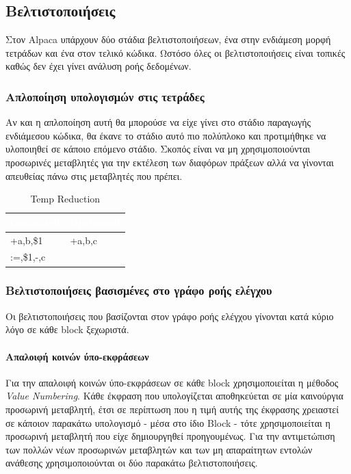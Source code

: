 \documentclass[12pt]{article}
\begin{document}
\subsection{Βελτιστοποιήσεις}
Στον Alpaca υπάρχουν δύο στάδια βελτιστοποιήσεων, ένα στην ενδιάμεση μορφή τετράδων και ένα στον τελικό κώδικα. Ωστόσο όλες οι βελτιστοποιήσεις είναι τοπικές καθώς δεν έχει γίνει ανάλυση ροής δεδομένων.
\subsubsection{Απλοποίηση υπολογισμών στις τετράδες}
Αν και η απλοποίηση αυτή θα μπορούσε να είχε γίνει στο στάδιο παραγωγής ενδιάμεσου κώδικα, θα έκανε το στάδιο αυτό πιο πολύπλοκο και προτιμήθηκε να υλοποιηθεί σε κάποιο επόμενο στάδιο. Σκοπός είναι να μη χρησιμοποιούνται προσωρινές μεταβλητές για την εκτέλεση των διαφόρων πράξεων αλλά να γίνονται απευθείας πάνω στις μεταβλητές που πρέπει.

\begin{table}
\centering
\begin{tabular}{|l|l|}
\hline
   \rowcolor{ablack}
    \textcolor{white}{Generated} & \textcolor{white}{Optimized} \\ \hline
    
    \rowcolor{gray}  
    +a,b,\$1 & +a,b,c \\ 
    \rowcolor{gray}    
    :=,\$1,-,c & \\
    
\hline
\end{tabular}
\caption{Temp Reduction}
\end{table}
\subsubsection{Βελτιστοποιήσεις βασισμένες στο γράφο ροής ελέγχου}
Οι βελτιστοποιήσεις που βασίζονται στον γράφο ροής ελέγχου γίνονται κατά κύριο λόγο σε κάθε block ξεχωριστά.
\paragraph{Απαλοιφή κοινών ύπο-εκφράσεων}
Για την απαλοιφή κοινών ύπο-εκφράσεων σε κάθε block χρησιμοποιείται η μέθοδος \textit{Value Numbering}. Κάθε έκφραση που υπολογίζεται αποθηκεύεται σε μία καινούργια προσωρινή μεταβλητή, έτσι σε περίπτωση που η τιμή αυτής της έκφρασης χρειαστεί σε κάποιον παρακάτω υπολογισμό - μέσα στο ίδιο Block - τότε χρησιμοποιείται η  προσωρινή μεταβλητή που είχε δημιουργηθεί προηγουμένως. Για την αντιμετώπιση των πολλών νέων προσωρινών μεταβλητών και των μη απαραίτητων εντολών ανάθεσης χρησιμοποιούνται οι δύο παρακάτω βελτιστοποιήσεις.
\end{document}
